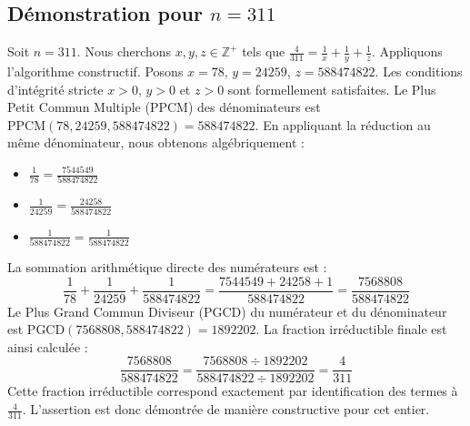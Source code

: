 \documentclass[11pt,a4paper]{article}
\begin{document}
\subsection{Démonstration pour $n = 311$}
Soit $n = 311$. Nous cherchons $x, y, z \in \mathbb{Z}^{+}$ tels que $\frac{4}{311} = \frac{1}{x} + \frac{1}{y} + \frac{1}{z}$.
Appliquons l'algorithme constructif. Posons $x = 78$, $y = 24259$, $z = 588474822$.
Les conditions d'intégrité stricte $x > 0$, $y > 0$ et $z > 0$ sont formellement satisfaites.
Le Plus Petit Commun Multiple (PPCM) des dénominateurs est $\text{PPCM}(78, 24259, 588474822) = 588474822$.
En appliquant la réduction au même dénominateur, nous obtenons algébriquement :
\begin{itemize}
    \item $\frac{1}{78} = \frac{7544549}{588474822}$
    \item $\frac{1}{24259} = \frac{24258}{588474822}$
    \item $\frac{1}{588474822} = \frac{1}{588474822}$
\end{itemize}
La sommation arithmétique directe des numérateurs est :
$$ \frac{1}{78} + \frac{1}{24259} + \frac{1}{588474822} = \frac{7544549 + 24258 + 1}{588474822} = \frac{7568808}{588474822} $$
Le Plus Grand Commun Diviseur (PGCD) du numérateur et du dénominateur est $\text{PGCD}(7568808, 588474822) = 1892202$.
La fraction irréductible finale est ainsi calculée :
$$ \frac{7568808}{588474822} = \frac{7568808 \div 1892202}{588474822 \div 1892202} = \frac{4}{311} $$
Cette fraction irréductible correspond exactement par identification des termes à $\frac{4}{311}$. L'assertion est donc démontrée de manière constructive pour cet entier.
\end{document}
